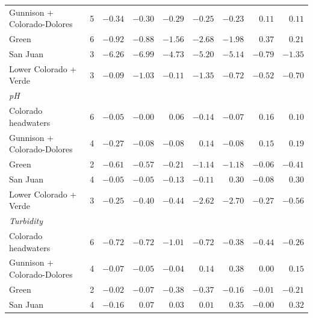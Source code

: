\documentclass[11pt]{article}
\begin{document}
\begin{table}[h]
{\begin{tabular}{l r rrrrrrr}
Gunnison + Colorado-Dolores & 5 & $-0.34$ & $-0.30$ & $-0.29$ & $-0.25$ & $-0.23$ & $0.11$ & $\mathbf{0.11}$ \\
Green & 6 & $-0.92$ & $-0.88$ & $-1.56$ & $-2.68$ & $-1.98$ & $\mathbf{0.37}$ & $0.21$ \\
San Juan & 3 & $-6.26$ & $-6.99$ & $-4.73$ & $-5.20$ & $-5.14$ & $\mathbf{-0.79}$ & $-1.35$ \\
Lower Colorado + Verde & 3 & $-0.09$ & $-1.03$ & $\mathbf{-0.11}$ & $-1.35$ & $-0.72$ & $-0.52$ & $-0.70$ \\
\midrule
\multicolumn{9}{l}{\emph{pH}} \\
Colorado headwaters & 6 & $-0.05$ & $-0.00$ & $0.06$ & $-0.14$ & $-0.07$ & $\mathbf{0.16}$ & $0.10$ \\
Gunnison + Colorado-Dolores & 4 & $-0.27$ & $-0.08$ & $-0.08$ & $0.14$ & $-0.08$ & $0.15$ & $\mathbf{0.19}$ \\
Green & 2 & $-0.61$ & $-0.57$ & $-0.21$ & $-1.14$ & $-1.18$ & $\mathbf{-0.06}$ & $-0.41$ \\
San Juan & 4 & $-0.05$ & $-0.05$ & $-0.13$ & $-0.11$ & $0.30$ & $-0.08$ & $\mathbf{0.30}$ \\
Lower Colorado + Verde & 3 & $-0.25$ & $-0.40$ & $-0.44$ & $-2.62$ & $-2.70$ & $\mathbf{-0.27}$ & $-0.56$ \\
\midrule
\multicolumn{9}{l}{\emph{Turbidity}} \\
Colorado headwaters & 6 & $-0.72$ & $-0.72$ & $-1.01$ & $-0.72$ & $-0.38$ & $-0.44$ & $\mathbf{-0.26}$ \\
Gunnison + Colorado-Dolores & 4 & $-0.07$ & $-0.05$ & $-0.04$ & $0.14$ & $\mathbf{0.38}$ & $0.00$ & $0.15$ \\
Green & 2 & $-0.02$ & $-0.07$ & $-0.38$ & $-0.37$ & $-0.16$ & $\mathbf{-0.01}$ & $-0.21$ \\
San Juan & 4 & $-0.16$ & $0.07$ & $0.03$ & $0.01$ & $\mathbf{0.35}$ & $-0.00$ & $0.32$ \\
\bottomrule
\end{tabular}}
\end{table}
\end{document}
